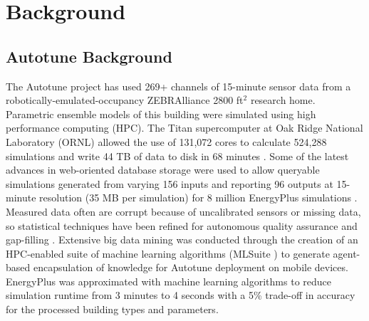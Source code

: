 \documentclass[preprint, review, 12pt]{elsarticle}
\begin{document}
\section{Background}
\label{sec:background}

\subsection{Autotune Background}
The Autotune project has used 269+ channels of 15-minute sensor data from a robotically-emulated-occupancy ZEBRAlliance \cite{cit:miller2012,cit:biswas2012} 2800 ft$^2$ research home. Parametric ensemble models of this building were simulated using high performance computing (HPC)\cite{cit:ostrouchov14}. The Titan supercomputer at Oak Ridge National Laboratory (ORNL) allowed the use of 131,072 cores to calculate 524,288 simulations and write 44 TB of data to disk in 68 minutes \cite{cit:sanyal2013a}. Some of the latest advances in web-oriented database storage were used to allow queryable simulations generated from varying 156 inputs and reporting 96 outputs at 15-minute resolution (35 MB per simulation) for 8 million EnergyPlus simulations \cite{cit:sanyal2013b}. Measured data often are corrupt because of  uncalibrated sensors or missing data, so statistical techniques have been refined for autonomous quality assurance and gap-filling \cite{cit:castello2012}. Extensive big data mining was conducted through the creation of an HPC-enabled suite of machine learning algorithms (MLSuite \cite{cit:edwards2013}) to generate agent-based encapsulation of knowledge for Autotune deployment on mobile devices. EnergyPlus was approximated with machine learning algorithms to reduce simulation runtime from 3 minutes to 4 seconds with a 5\% trade-off in accuracy for the processed building types and parameters\cite{cit:edwards2013}. %
\end{document}
